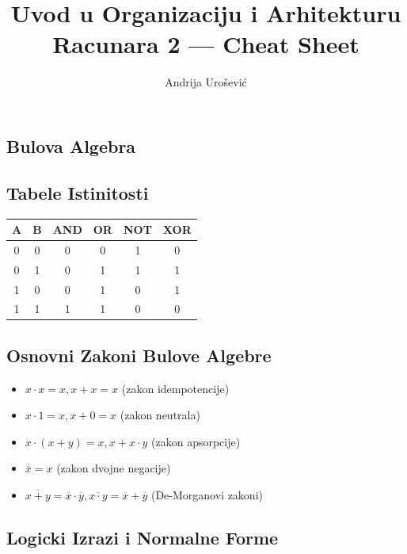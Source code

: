 \documentclass[12p,a4paper]{article}
\title{Uvod u Organizaciju i Arhitekturu Racunara 2 --- Cheat Sheet}
\author{Andrija Urošević}
\begin{document}
\maketitle

\begin{multicols}{2}

\section{Bulova Algebra}

    \subsection{Tabele Istinitosti}

    \begin{tabular}{*{6}{c}}
        A & B & AND & OR & NOT & XOR \\
        \midrule
        0 & 0 & 0 & 0 & 1 & 0 \\
        0 & 1 & 0 & 1 & 1 & 1 \\
        1 & 0 & 0 & 1 & 0 & 1 \\
        1 & 1 & 1 & 1 & 0 & 0 \\
    \end{tabular}

    \subsection{Osnovni Zakoni Bulove Algebre}

    \begin{itemize}
        \itemsep0em
        \item $x \cdot x = x, x + x = x$ (zakon idempotencije)
        \item $x \cdot 1 = x, x + 0 = x$ (zakon neutrala)
        \item $x \cdot (x + y) = x, x + x \cdot y$ (zakon apsorpcije)
        \item $\overline{\overline{x}} = x$ (zakon dvojne negacije)
        \item $\overline{x + y} = \overline{x} \cdot \overline{y},
            \overline{x \cdot y} = \overline{x} + \overline{y}$
            (De-Morganovi zakoni)
    \end{itemize}

    \subsection{Logicki Izrazi i Normalne Forme}


\end{multicols}
\end{document}
